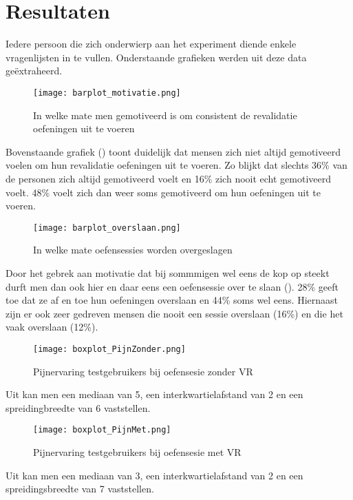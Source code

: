 \section{Resultaten}
Iedere persoon die zich onderwierp aan het experiment diende enkele vragenlijsten in te vullen. Onderstaande grafieken werden uit deze data geëxtraheerd.

\begin{figure}[h]
    \centering
    \texttt{[image: barplot\_motivatie.png]}
    \caption{In welke mate men gemotiveerd is om consistent de revalidatie oefeningen uit te voeren}
\end{figure}

Bovenstaande grafiek (\cite{Figuur 6.3}) toont duidelijk dat mensen zich niet altijd gemotiveerd voelen om hun revalidatie oefeningen uit te voeren. Zo blijkt dat slechts 36\% van de personen zich altijd gemotiveerd voelt en 16\% zich nooit echt gemotiveerd voelt. 48\% voelt zich dan weer soms gemotiveerd om hun oefeningen uit te voeren.

\begin{figure}[h]
    \centering
    \texttt{[image: barplot\_overslaan.png]}
    \caption{In welke mate oefensessies worden overgeslagen}
\end{figure}

Door het gebrek aan motivatie dat bij sommmigen wel eens de kop op steekt durft men dan ook hier en daar eens een oefensessie over te slaan (\cite{Figuur 6.4}). 28\% geeft toe dat ze af en toe hun oefeningen overslaan en 44\% soms wel eens. Hiernaast zijn er ook zeer gedreven mensen die nooit een sessie overslaan (16\%) en die het vaak overslaan (12\%).

\begin{figure}[h]
    \centering
    \texttt{[image: boxplot\_PijnZonder.png]}
    \caption{Pijnervaring testgebruikers bij oefensesie zonder VR}
\end{figure}

Uit \cite{Figuur 6.5} kan men een mediaan van 5, een interkwartielafstand van 2 en een spreidingbreedte van 6 vaststellen.

\begin{figure}[h]
    \centering
    \texttt{[image: boxplot\_PijnMet.png]}
    \caption{Pijnervaring testgebruikers bij oefensesie met VR}
\end{figure}

Uit \cite{Figuur 6.6} kan men een mediaan van 3, een interkwartielafstand van 2 en een spreidingsbreedte van 7 vaststellen.

